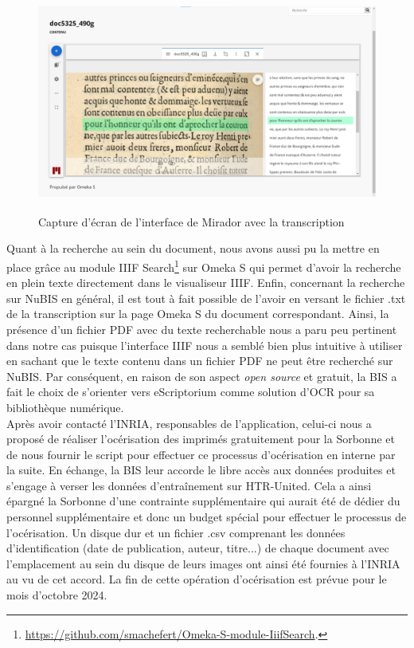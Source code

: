 \documentclass[a4paper,12pt,twoside]{book}
\begin{document}
\begin{figure} [H]
	\includegraphics[width=6.21736in,height=2.84514in]{vertopal_157ae480aa4a4b07be198b586a812241/media/image15.png}
	\caption{Capture d'écran de l'interface de Mirador avec la transcription}
\end{figure}



Quant à la recherche au sein du document, nous avons aussi pu la mettre
en place grâce au module IIIF Search\footnote{\url{https://github.com/smachefert/Omeka-S-module-IiifSearch}.}
sur Omeka S qui permet d'avoir la recherche en plein texte directement
dans le visualiseur IIIF. Enfin, concernant la recherche sur NuBIS en
général, il est tout à fait possible de l'avoir en versant le fichier
.txt de la transcription sur la page Omeka S du document correspondant.
Ainsi, la présence d'un fichier PDF avec du texte recherchable nous a
paru peu pertinent dans notre cas puisque l'interface IIIF nous a semblé
bien plus intuitive à utiliser en sachant que le texte contenu dans un
fichier PDF ne peut être recherché sur NuBIS. Par conséquent, en raison
de son aspect \emph{open source} et gratuit, la BIS a fait le choix de
s'orienter vers eScriptorium comme solution d'OCR pour sa bibliothèque
numérique. \\

Après avoir contacté l'INRIA, responsables de l'application,
celui-ci nous a proposé de réaliser l'océrisation des imprimés gratuitement
pour la Sorbonne et de nous fournir le script pour effectuer ce processus d'océrisation en interne par la suite. En échange, la BIS leur accorde le libre accès aux données
produites et s'engage à verser les données d'entraînement sur HTR-United. Cela a ainsi épargné la Sorbonne d'une contrainte supplémentaire
qui aurait été de dédier du personnel supplémentaire et donc un
budget spécial pour effectuer le processus de l'océrisation. Un disque dur et un fichier .csv comprenant les données d'identification (date de publication, auteur, titre...) de chaque document avec l'emplacement au sein du disque de leurs images ont ainsi été fournies à l'INRIA au vu de cet accord. La fin de cette opération d'océrisation est prévue pour le mois d'octobre 2024. \\
\end{document}
